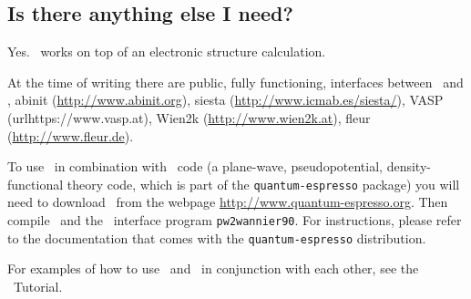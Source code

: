 \subsection{Is there anything else I need?}

Yes. \wannier\ works on top of an electronic structure
calculation. 

At the time of writing there are public, fully functioning, interfaces
between \wannier\ and \pwscf,  {\sc abinit} (\url{http://www.abinit.org}), {\sc siesta} (\url{http://www.icmab.es/siesta/}),
{\sc VASP} (url{https://www.vasp.at}), {\sc Wien2k} (\url{http://www.wien2k.at}), {\sc fleur} (\url{http://www.fleur.de}). 

To use 
\wannier\ in combination with 
\pwscf\ code (a plane-wave, pseudopotential, density-functional theory
code, which is part of the {\tt quantum-espresso} package) you 
will need to download \pwscf\ from the webpage \url{http://www.quantum-espresso.org}. Then compile \pwscf\
and the \wannier\ interface program {\tt pw2wannier90}. For
instructions, please refer to the
documentation that comes with the {\tt quantum-espresso} distribution.

For examples of how to use \pwscf\ and \wannier\ in conjunction with
each other, see the \wannier\ Tutorial.






